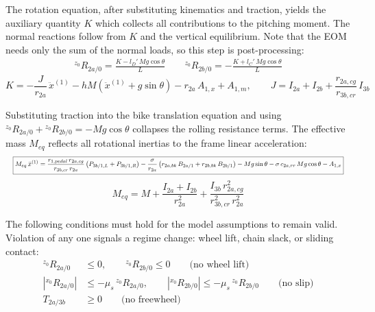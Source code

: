 \begin{aiblock}
The rotation equation, after substituting kinematics and traction, yields the auxiliary quantity $K$ which collects all contributions to the pitching moment. The normal reactions follow from $K$ and the vertical equilibrium. Note that the EOM needs only the sum of the normal loads, so this step is post-processing:
\begin{align}
    \boxed{{}^{z_0}R_{2a/0} = \frac{K - l_D'\,Mg\cos\theta}{L}} \qquad
    \boxed{{}^{z_0}R_{2b/0} = -\frac{K + l_C'\,Mg\cos\theta}{L}}
\end{align}
\begin{equation}
    K = -\frac{J}{r_{2a}}\,\ddot{x}^{(1)}
        - hM\!\left(\ddot{x}^{(1)} + g\sin\theta\right)
        - r_{2a}\,A_{1,x} + A_{1,m},
    \qquad
    J = I_{2a} + I_{2b} + \frac{r_{2a,cg}}{r_{3b,cr}}\,I_{3b}
\end{equation}

Substituting traction into the bike translation equation and using ${}^{z_0}R_{2a/0} + {}^{z_0}R_{2b/0} = -Mg\cos\theta$ collapses the rolling resistance terms. The effective mass $M_{eq}$ reflects all rotational inertias to the frame linear acceleration:
\begin{equation}
    \resizebox{\linewidth}{!}{$\displaystyle
    \boxed{
    M_{eq}\,\ddot{x}^{(1)} =
        \frac{r_{1,pedal}\,r_{2a,cg}}{r_{3b,cr}\,r_{2a}}\left(P_{3b/1,L} + P_{3b/1,R}\right)
        - \frac{\sigma}{r_{2a}}\left(r_{2a,bk}\,B_{2a/1} + r_{2b,bk}\,B_{2b/1}\right)
        - Mg\sin\theta
        - \sigma\,c_{2a,rr}\,Mg\cos\theta
        - A_{1,x}
    }$}
\end{equation}
\begin{equation}
    M_{eq} = M + \frac{I_{2a} + I_{2b}}{r_{2a}^2} + \frac{I_{3b}\,r_{2a,cg}^2}{r_{3b,cr}^2\,r_{2a}^2}
\end{equation}

The following conditions must hold for the model assumptions to remain valid. Violation of any one signals a regime change: wheel lift, chain slack, or sliding contact:
\begin{align}
    {}^{z_0}R_{2a/0} &\le 0, \qquad {}^{z_0}R_{2b/0} \le 0 \qquad \text{(no wheel lift)} \\
    \left|{}^{x_0}R_{2a/0}\right| &\le -\mu_s\,{}^{z_0}R_{2a/0}, \qquad
    \left|{}^{x_0}R_{2b/0}\right| \le -\mu_s\,{}^{z_0}R_{2b/0} \qquad \text{(no slip)} \\
    T_{2a/3b} &\ge 0 \qquad \text{(no freewheel)}
\end{align}


\end{aiblock}
